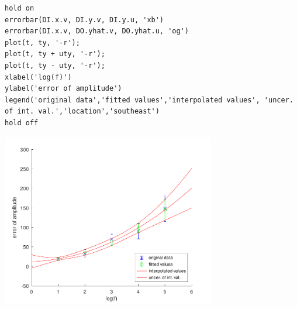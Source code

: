 \begin{lstlisting}
hold on
errorbar(DI.x.v, DI.y.v, DI.y.u, 'xb')
errorbar(DI.x.v, DO.yhat.v, DO.yhat.u, 'og')
plot(t, ty, '-r');
plot(t, ty + uty, '-r');
plot(t, ty - uty, '-r');
xlabel('log(f)')
ylabel('error of amplitude')
legend('original data','fitted values','interpolated values', 'uncer. of int. val.','location','southeast')
hold off
\end{lstlisting}
\begin{center}
\includegraphics[width=0.7\textwidth]{algs_examples_published/CCC_alg_example-1.pdf}
\end{center}


\stopcontents[localtoc]
